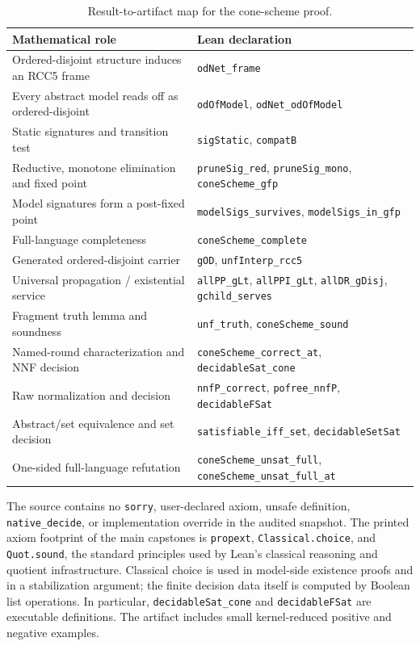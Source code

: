 \documentclass[11pt]{article}
\theoremstyle{plain}
\theoremstyle{definition}
\theoremstyle{remark}
\newcommand{\code}[1]{\texttt{#1}}
\begin{document}
\begin{table}[htbp]
\centering
\small
\begin{tabularx}{\textwidth}{@{}Yl@{}}
\toprule
Mathematical role & Lean declaration\\
\midrule
Ordered-disjoint structure induces an RCC5 frame & \code{odNet\_frame}\\
Every abstract model reads off as ordered-disjoint & \code{odOfModel}, \code{odNet\_odOfModel}\\
Static signatures and transition test & \code{sigStatic}, \code{compatB}\\
Reductive, monotone elimination and fixed point & \code{pruneSig\_red}, \code{pruneSig\_mono}, \code{coneScheme\_gfp}\\
Model signatures form a post-fixed point & \code{modelSigs\_survives}, \code{modelSigs\_in\_gfp}\\
Full-language completeness & \code{coneScheme\_complete}\\
Generated ordered-disjoint carrier & \code{gOD}, \code{unfInterp\_rcc5}\\
Universal propagation / existential service & \code{allPP\_gLt}, \code{allPPI\_gLt}, \code{allDR\_gDisj}, \code{gchild\_serves}\\
Fragment truth lemma and soundness & \code{unf\_truth}, \code{coneScheme\_sound}\\
Named-round characterization and NNF decision & \code{coneScheme\_correct\_at}, \code{decidableSat\_cone}\\
Raw normalization and decision & \code{nnfP\_correct}, \code{pofree\_nnfP}, \code{decidableFSat}\\
Abstract/set equivalence and set decision & \code{satisfiable\_iff\_set}, \code{decidableSetSat}\\
One-sided full-language refutation & \code{coneScheme\_unsat\_full}, \code{coneScheme\_unsat\_full\_at}\\
\bottomrule
\end{tabularx}
\caption{Result-to-artifact map for the cone-scheme proof.}
\label{tab:theoremmap}
\end{table}

The source contains no \code{sorry}, user-declared axiom, unsafe definition,
\code{native\_decide}, or implementation override in the audited snapshot.
The printed axiom footprint of the main capstones is
\code{propext}, \code{Classical.choice}, and \code{Quot.sound}, the standard
principles used by Lean's classical reasoning and quotient infrastructure.
Classical choice is used in model-side existence proofs and in a stabilization
argument; the finite decision data itself is computed by Boolean list
operations.  In particular, \code{decidableSat\_cone} and
\code{decidableFSat} are executable definitions.  The artifact includes small
kernel-reduced positive and negative examples.
\end{document}
